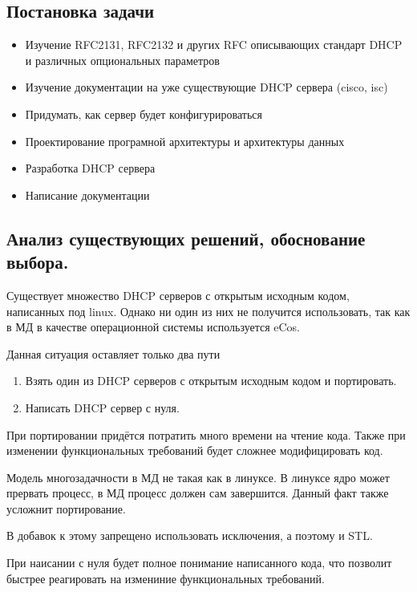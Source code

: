 \documentclass[12pt]{article}
\begin{document}
\subsection{Постановка задачи}

\begin{itemize}
    \item Изучение RFC2131, RFC2132 и других RFC описывающих стандарт DHCP и различных опциональных параметров
    \item Изучение документации на уже существующие DHCP сервера (cisco, isc)
    \item Придумать, как сервер будет конфигурироваться
    \item Проектирование програмной архитектуры и архитектуры данных
    \item Разработка DHCP сервера
    \item Написание документации
\end{itemize}

\subsection{Анализ существующих решений, обоснование выбора.}

Существует множество DHCP серверов с открытым исходным кодом, написанных под linux.
Однако ни один из них не получится использовать, так как в МД в качестве операционной системы используется eCos.

Данная ситуация оставляет только два пути

\begin{enumerate}
    \item Взять один из DHCP серверов с открытым исходным кодом и портировать.
    \item Написать DHCP сервер с нуля.
\end{enumerate}

При портировании придётся потратить много времени на чтение кода.
Также при изменении функциональных требований будет сложнее модифицировать код.

Модель многозадачности в МД не такая как в линуксе.
В линуксе ядро может прервать процесс, в МД процесс должен сам завершится.
Данный факт также усложнит портирование.

В добавок к этому запрещено использовать исключения, а поэтому и STL.

При наисании с нуля будет полное понимание написанного кода, что позволит быстрее реагировать на измениние функциональных требований.
\end{document}
